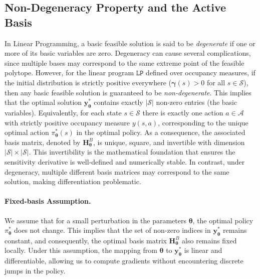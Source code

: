 \subsection{Non-Degeneracy Property and the Active Basis}
In Linear Programming, a basic feasible solution is said to be \emph{degenerate} if one or more of its basic variables are zero. Degeneracy can cause several complications, since multiple bases may correspond to the same extreme point of the feasible polytope. However, for the linear program $\mathtt{LP}$ defined over occupancy measures, if the initial distribution is strictly positive everywhere ($\bm{\gamma}(s) > 0$ for all $s \in \mathcal{S}$), then any basic feasible solution is guaranteed to be \emph{non-degenerate}. This implies that the optimal solution $\bm{y}_{\bm{\theta}}^*$ contains exactly $|\mathcal{S}|$ non-zero entries (the basic variables). Equivalently, for each state $s \in \mathcal{S}$ there is exactly one action $a \in \mathcal{A}$ with strictly positive occupancy measure $y(s,a)$, corresponding to the unique optimal action $\pi_{\bm{\theta}}^*(s)$ in the optimal policy. As a consequence, the associated basis matrix, denoted by $\bm{H}_{\bm{\theta}}^B$, is unique, square, and invertible with dimension $|\mathcal{S}| \times |\mathcal{S}|$. This invertibility is the mathematical foundation that ensures the sensitivity derivative is well-defined and numerically stable. In contrast, under degeneracy, multiple different basis matrices may correspond to the same solution, making differentiation problematic. 


\paragraph{Fixed-basis Assumption.}
We assume that for a small perturbation in the parameters $\bm{\theta}$, the optimal policy $\pi_{\bm{\theta}}^*$ does not change. This implies that the set of non-zero indices in $\bm{y}_{\bm{\theta}}^*$ remains constant, and consequently, the optimal basis matrix $\bm{H}_{\bm{\theta}}^B$ also remains fixed locally. Under this assumption, the mapping from $\bm{\theta}$ to $\bm{y}_{\bm{\theta}}^*$ is linear and differentiable, allowing us to compute gradients without encountering discrete jumps in the policy.

